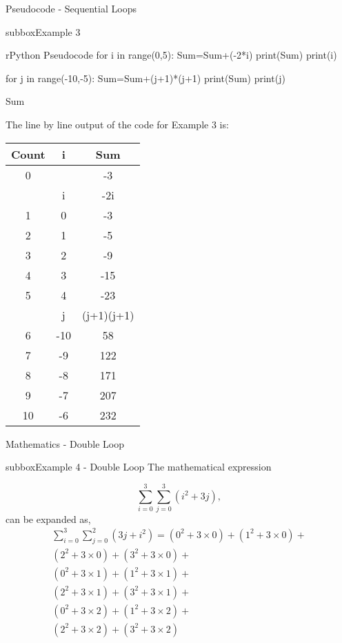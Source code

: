 \documentclass[10pt,a4paper]{article}
\begin{document}
\begin{multicols}{3}
\begin{textbox}{Pseudocode - Sequential Loops}
\begin{subbox}{subbox}{Example 3}
\begin{codebox}{r}{Python Pseudocode}
for i in range(0,5):
    Sum=Sum+(-2*i)
    print(Sum)
    print(i)
    
for j in range(-10,-5):
    Sum=Sum+(j+1)*(j+1)
    print(Sum)
    print(j)
    
Sum
\end{codebox}
The line by line output of the code for Example 3 is:
\begin{center}
\begin{tabular}{ c| c| c }
 Count &i & Sum \\ \hline
 0 & & -3  \\
 \hline
  &i & -2i \\ \hline
 1&0 & -3  \\
 2&1 & -5  \\
 3&2 & -9  \\
 4&3 & -15  \\
 5&4 & -23  \\
 \hline
   &j & (j+1)(j+1) \\ \hline
 6&-10 & 58  \\
 7&-9 & 122  \\
 8&-8 & 171  \\
 9&-7 & 207  \\
 10&-6 & 232  
\end{tabular}
\end{center}
\end{subbox}
\end{textbox}
\begin{textbox}{Mathematics - Double Loop}

\begin{subbox}{subbox}{Example 4 - Double Loop}
The mathematical expression

\[ \sum_{i=0}^{3}\sum_{j=0}^{3} (i^2+3j), \]
can be expanded as,
\begin{multline*}
\sum_{i=0}^{3}\sum_{j=0}^{2} (3j+i^2)=(0^2+3\times 0)+(1^2+3\times 0)+\\
(2^2+3\times 0)+(3^2+3\times 0)+\\
(0^2+3\times 1)+(1^2+3\times 1)+\\
(2^2+3\times 1)+(3^2+3\times 1)+\\
(0^2+3\times 2)+(1^2+3\times 2)+\\
(2^2+3\times 2)+(3^2+3\times 2)\\
\end{multline*}

\end{subbox}

\end{textbox}


\end{multicols}
\end{document}
